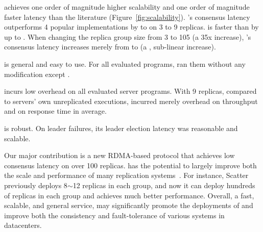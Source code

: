 \begin{tightenum}
\item \xxx achieves one order of magnitude higher scalability and one
order of magnitude faster latency than the literature 
(Figure~\ref{fig:scalability}). \xxx's consensus latency outperforms 4 
popular \paxos implementations by \comptradlow to \comptradhigh on 3 to 
9 replicas. \xxx is faster than \dare by up to \fasterDARE. When changing the 
replica group size from 3 to 105 (a 35x
increase), \xxx's consensus latency increases merely from \xxxlatencythree \us 
to \xxxlatencyonezerofive \us (a \xxxscalability, sub-linear increase).

\item \xxx is general and easy to use. For all \nprog evaluated programs, \xxx 
ran them without any modification except \calvin.


\item \xxx incurs low overhead on all \nprog evaluated server programs.
With 9 replicas, compared to servers' own unreplicated executions, \xxx
incurred merely \tputoverhead overhead on throughput and \latencyoverhead on
response time in average.

\item \xxx is robust. On leader failures, its leader election
latency was reasonable and scalable.







\end{tightenum}

Our major contribution is a new RDMA-based \paxos protocol that achieves 
low consensus latency on over 100 replicas. \xxx has the potential to largely 
improve both the scale and performance of many replication 
systems~\cite{scatter:sosp11,manos:hotdep10,crane:sosp15,rex:eurosys14, 
ssmr:dsn14,spaxos:srds12}. For instance, Scatter~\cite{scatter:sosp11} 
previously deploys 8$\sim$12 replicas in each \paxos group, and now it can 
deploy hundreds of replicas in each group and achieves much better performance. 
Overall, a fast, scalable, and general service, \xxx may significantly promote 
the deployments of \paxos and improve both the consistency and 
fault-tolerance of various systems in datacenters.

